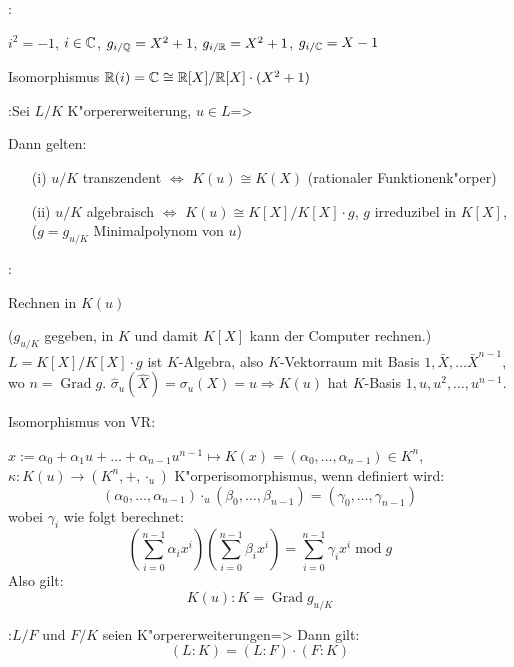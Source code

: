 \example{}:{$i^2=-1$, $i\in \mathbb C$, $g_{i/\mathbb Q}=X^2+1$, $g_{i/\mathbb R}=X^2+1$,
 $g_{i/\mathbb C}=X-1$

 Isomorphismus $\mathbb R(i)=\mathbb C\cong \mathbb R[X]/\mathbb R[X]\cdot(X^2+1)$
}
\theorem{}:{Sei $L/K$ K"orpererweiterung, $u\in L$}=>{
 Dann gelten:\begin{enumerate}
 \item[(i)] $u/K$ transzendent $\iff$ $K(u)\cong K(X)$ (rationaler Funktionenk"orper)
 \item[(ii)] $u/K$ algebraisch $\iff$ $K(u)\cong K[X]/K[X]\cdot g$, $g$ irreduzibel in
 $K[X]$, ($g=g_{u/K}$ Minimalpolynom von $u$)
 \end{enumerate}
}
\remark{}:{Rechnen in $K(u)$

 ($g_{u/K}$ gegeben, in $K$ und damit $K[X]$ kann der Computer rechnen.)
 $L=K[X]/K[X]\cdot g$ ist $K$-Algebra, also $K$-Vektorraum mit Basis $1,\bar{X}, \ldots \bar{X}^{n-1}$,
 wo $n=\operatorname{Grad}g$.
 $\hat\sigma_u(\hat{X})=\sigma_u(X)=u \Rightarrow K(u)$ hat $K$-Basis $1, u, u^2, \ldots,u^{n-1}$.
 
 Isomorphismus von VR:
 
 $x:=\alpha_0+\alpha_1 u+ \ldots +\alpha_{n-1} u^{n-1}\mapsto K(x)=(\alpha_0, \ldots, \alpha_{n-1})\in K^n$,\\
 $\kappa:K(u)\longrightarrow (K^n,+,\cdot_{u})$ K"orperisomorphismus, wenn definiert wird:
 \[(\alpha_0, \ldots, \alpha_{n-1})\cdot_{u}(\beta_0, \ldots, \beta_{n-1})=(\gamma_0,\ldots, \gamma_{n-1})\]
 wobei $\gamma_i$ wie folgt berechnet:
 \[(\sum_{i=0}^{n-1}\alpha_i x^i)(\sum_{i=0}^{n-1}\beta_i x^i)=\sum_{i=0}^{n-1}\gamma_i x^i \operatorname{mod} g\]
 Also gilt:
 \[K(u):K=\operatorname{Grad}g_{u/K}\]
 }
:{$L/F$ und $F/K$ seien K"orpererweiterungen}=>{
 Dann gilt:
 \[(L:K)=(L:F)\cdot (F:K)\]
 }
